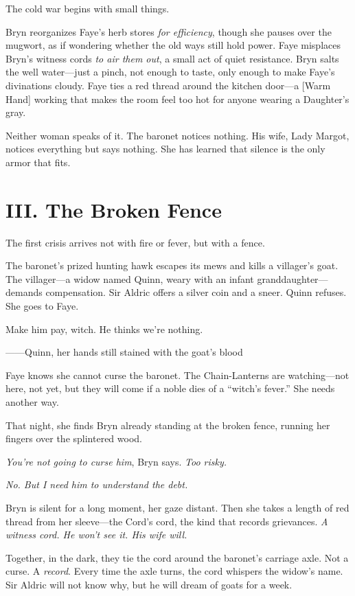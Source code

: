 \documentclass[11pt]{book}
\newcommand{\ritetag}[1]{\textsf{[#1]}}
\begin{document}
The cold war begins with small things.

Bryn reorganizes Faye's herb stores \textit{for efficiency}, though she pauses over the mugwort, as if wondering whether the old ways still hold power. Faye misplaces Bryn's witness cords \textit{to air them out}, a small act of quiet resistance. Bryn salts the well water---just a pinch, not enough to taste, only enough to make Faye's divinations cloudy. Faye ties a red thread around the kitchen door---a \ritetag{Warm Hand} working that makes the room feel too hot for anyone wearing a Daughter's gray.

Neither woman speaks of it. The baronet notices nothing. His wife, Lady Margot, notices everything but says nothing. She has learned that silence is the only armor that fits.

\section*{III. The Broken Fence}
The first crisis arrives not with fire or fever, but with a fence.

The baronet's prized hunting hawk escapes its mews and kills a villager's goat. The villager---a widow named Quinn, weary with an infant granddaughter---demands compensation. Sir Aldric offers a silver coin and a sneer. Quinn refuses. She goes to Faye.

\epigraph{Make him pay, witch. He thinks we're nothing.}{------Quinn, her hands still stained with the goat's blood}

Faye knows she cannot curse the baronet. The Chain-Lanterns are watching---not here, not yet, but they will come if a noble dies of a ``witch's fever.'' She needs another way.

That night, she finds Bryn already standing at the broken fence, running her fingers over the splintered wood.

\textit{You're not going to curse him}, Bryn says. \textit{Too risky.}

\textit{No. But I need him to understand the debt.}

Bryn is silent for a long moment, her gaze distant. Then she takes a length of red thread from her sleeve---the Cord's cord, the kind that records grievances. \textit{A witness cord. He won't see it. His wife will.}

Together, in the dark, they tie the cord around the baronet's carriage axle. Not a curse. A \textit{record}. Every time the axle turns, the cord whispers the widow's name. Sir Aldric will not know why, but he will dream of goats for a week.
\end{document}
